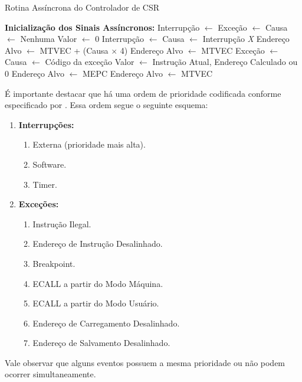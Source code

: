\documentclass[
	12pt,				%
	openright,			%
	oneside,			%
	a4paper,			%
	english,			%
	french,				%
	spanish,			%
	brazil,				%
	]{abntex2}
\begin{document}
\begin{algorithm}[h!]
\caption{Rotina Assíncrona do Controlador de CSR}
\label{alg:rotina_assincrona}
\begin{algorithmic}[1]
    \STATE \textbf{Inicialização dos Sinais Assíncronos:}
    \STATE \hspace{1em} Interrupção $\leftarrow$ \FALSE
    \STATE \hspace{1em} Exceção $\leftarrow$ \FALSE
    \STATE \hspace{1em} Causa $\leftarrow$ Nenhuma
    \STATE \hspace{1em} Valor $\leftarrow$ 0
    \STATE
            \STATE Interrupção $\leftarrow$ \TRUE
            \STATE Causa $\leftarrow$ Interrupção \textit{X}
        \ENDIF
    \ENDIF
    \STATE
            \STATE Endereço Alvo $\leftarrow$ MTVEC + (Causa $\times$ 4)
        \ELSE
            \STATE Endereço Alvo $\leftarrow$ MTVEC
        \ENDIF
        \STATE Exceção $\leftarrow$ \TRUE
        \STATE Causa $\leftarrow$ Código da exceção
        \STATE Valor $\leftarrow$ Instrução Atual, Endereço Calculado ou 0
        \STATE Endereço Alvo $\leftarrow$ MEPC
    \ENDIF
    \STATE
        \STATE Endereço Alvo $\leftarrow$ MTVEC
    \ENDIF
\end{algorithmic}
\end{algorithm}

É importante destacar que há uma ordem de prioridade codificada conforme especificado por . Essa ordem segue o seguinte esquema:
\begin{enumerate}
    \item \textbf{Interrupções:}
    \begin{enumerate}
        \item Externa (prioridade mais alta).
        \item Software.
        \item Timer.
    \end{enumerate}
    \item \textbf{Exceções:}
    \begin{enumerate}
        \item Instrução Ilegal.
        \item Endereço de Instrução Desalinhado.
        \item Breakpoint.
        \item ECALL a partir do Modo Máquina.
        \item ECALL a partir do Modo Usuário.
        \item Endereço de Carregamento Desalinhado.
        \item Endereço de Salvamento Desalinhado.
    \end{enumerate}
\end{enumerate}
Vale observar que alguns eventos possuem a mesma prioridade ou não podem ocorrer simultaneamente.
\end{document}
